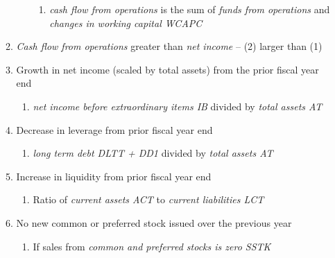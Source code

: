 \documentclass[12pt]{article}
\begin{document}
\begin{enumerate}
\begin{enumerate}
\begin{enumerate}
                      \begin{enumerate}
                          \item \emph{cash flow from operations} is the sum of \emph{funds from operations} and \emph{changes in working capital WCAPC}
                      \end{enumerate}

                    \end{enumerate}  

                \item \emph{Cash flow from operations} greater than \emph{net income} -- (2) larger than (1)

                \item Growth in net income (scaled by total assets) from the prior fiscal year end 

                    \begin{enumerate}
                        \item \emph{net income before extraordinary items IB} divided by \emph{total assets AT} 
                    \end{enumerate}

                \item Decrease in leverage from prior fiscal year end 

                    \begin{enumerate}
                        \item \emph{long term debt DLTT + DD1} divided by \emph{total assets AT} 
                    \end{enumerate}
                    
                \item Increase in liquidity from prior fiscal year end 

                    \begin{enumerate}
                        \item Ratio of \emph{current assets ACT} to \emph{current liabilities LCT}
                    \end{enumerate}
                
                \item No new common or preferred stock issued over the previous year 

                    \begin{enumerate}
                        \item If sales from \emph{common and preferred stocks is zero SSTK}
                    \end{enumerate}


\end{enumerate}
\end{enumerate}
\end{document}
